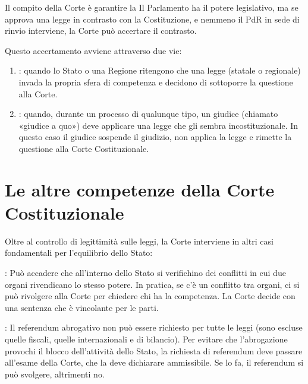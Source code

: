 \documentclass[letterpaper,10pt,italian]{sphinxmanual}
\begin{document}
\sphinxAtStartPar
Il compito della Corte è garantire la 
Il Parlamento ha il potere legislativo, ma se approva una legge in contrasto con la Costituzione, e nemmeno il PdR in sede di rinvio interviene, la Corte può accertare il contrasto.

\sphinxAtStartPar
Questo accertamento avviene attraverso due vie:
\begin{enumerate}
%
\item {} 
\sphinxAtStartPar
{}: quando lo Stato o una Regione ritengono che una legge (statale o regionale) invada la propria sfera di competenza e decidono di sottoporre la questione alla Corte.

\item {} 
\sphinxAtStartPar
{}: quando, durante un processo di qualunque tipo, un giudice (chiamato «giudice a quo») deve applicare una legge che gli sembra incostituzionale. In questo caso il giudice sospende il giudizio, non applica la legge e rimette la questione alla Corte Costituzionale.

\end{enumerate}

\sphinxstepscope


\chapter{Le altre competenze della Corte Costituzionale}
\label{\detokenize{Le altre competenze della Corte Costituzionale:le-altre-competenze-della-corte-costituzionale}}\label{\detokenize{Le altre competenze della Corte Costituzionale::doc}}
\sphinxAtStartPar
Oltre al controllo di legittimità sulle leggi, la Corte interviene in altri casi fondamentali per l’equilibrio
dello Stato:

\sphinxAtStartPar
{}: Può accadere che all’interno dello Stato si verifichino dei conflitti in cui due
organi rivendicano lo stesso potere.
In pratica, se c’è un conflitto tra organi, ci si può rivolgere alla Corte per chiedere chi ha la competenza.
La Corte decide con una sentenza che è vincolante per le parti.

\sphinxAtStartPar
{}: Il referendum abrogativo non può essere richiesto per tutte le leggi
(sono escluse quelle fiscali, quelle internazionali e di bilancio).
Per evitare che l’abrogazione provochi il blocco dell’attività dello Stato, la richiesta di referendum deve passare
all’esame della Corte, che la deve dichiarare ammissibile.
Se lo fa, il referendum si può svolgere, altrimenti no.
\end{document}
